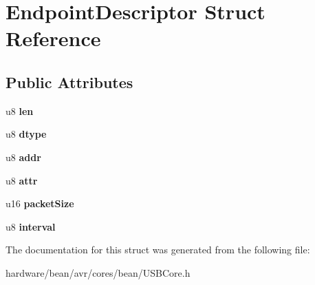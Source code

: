 \hypertarget{struct_endpoint_descriptor}{}\section{Endpoint\+Descriptor Struct Reference}
\label{struct_endpoint_descriptor}
\subsection*{Public Attributes}
\begin{DoxyCompactItemize}
\item 
\hypertarget{struct_endpoint_descriptor_ac4c8c282264bb159bc4f789555cf8023}{}u8 {\bfseries len}\label{struct_endpoint_descriptor_ac4c8c282264bb159bc4f789555cf8023}

\item 
\hypertarget{struct_endpoint_descriptor_a858d2fed4b36c0b974ee0827fedec23a}{}u8 {\bfseries dtype}\label{struct_endpoint_descriptor_a858d2fed4b36c0b974ee0827fedec23a}

\item 
\hypertarget{struct_endpoint_descriptor_a889ee6bef249cfc21fb0ea12cb6d43f6}{}u8 {\bfseries addr}\label{struct_endpoint_descriptor_a889ee6bef249cfc21fb0ea12cb6d43f6}

\item 
\hypertarget{struct_endpoint_descriptor_a4ef2e3e8ce76f15b3d9a6685e6815681}{}u8 {\bfseries attr}\label{struct_endpoint_descriptor_a4ef2e3e8ce76f15b3d9a6685e6815681}

\item 
\hypertarget{struct_endpoint_descriptor_a2e22c1c94c5f4637abae1184b35cab9c}{}u16 {\bfseries packet\+Size}\label{struct_endpoint_descriptor_a2e22c1c94c5f4637abae1184b35cab9c}

\item 
\hypertarget{struct_endpoint_descriptor_a554a59624f5e7b888fd457000cdcec2e}{}u8 {\bfseries interval}\label{struct_endpoint_descriptor_a554a59624f5e7b888fd457000cdcec2e}

\end{DoxyCompactItemize}


The documentation for this struct was generated from the following file\+:\begin{DoxyCompactItemize}
\item 
hardware/bean/avr/cores/bean/U\+S\+B\+Core.\+h\end{DoxyCompactItemize}
